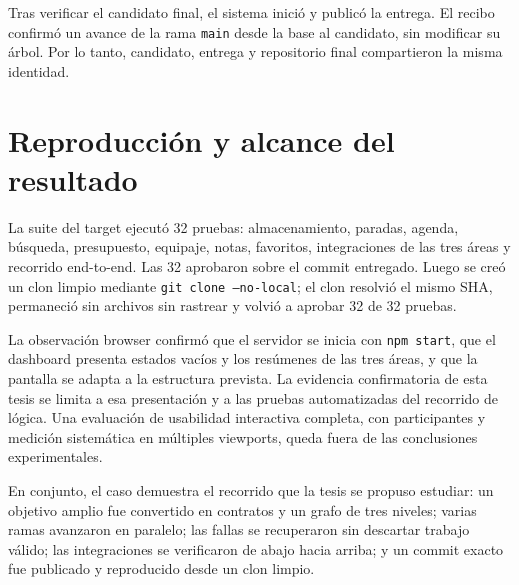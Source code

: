 Tras verificar el candidato final, el sistema inició y publicó la entrega. El
recibo confirmó un avance de la rama \texttt{main} desde la base al candidato,
sin modificar su árbol. Por lo tanto, candidato, entrega y repositorio final
compartieron la misma identidad.

\section{Reproducción y alcance del resultado}

La suite del target ejecutó 32 pruebas: almacenamiento, paradas, agenda,
búsqueda, presupuesto, equipaje, notas, favoritos, integraciones de las tres
áreas y recorrido end-to-end. Las 32 aprobaron sobre el commit entregado. Luego
se creó un clon limpio mediante \texttt{git clone --no-local}; el clon resolvió
el mismo SHA, permaneció sin archivos sin rastrear y volvió a aprobar 32 de 32
pruebas.

La observación browser confirmó que el servidor se inicia con
\texttt{npm start}, que el dashboard presenta estados vacíos y los resúmenes de
las tres áreas, y que la pantalla se adapta a la estructura prevista. La
evidencia confirmatoria de esta tesis se limita a esa presentación y a las
pruebas automatizadas del recorrido de lógica. Una evaluación de usabilidad
interactiva completa, con participantes y medición sistemática en múltiples
viewports, queda fuera de las conclusiones experimentales.

En conjunto, el caso demuestra el recorrido que la tesis se propuso estudiar:
un objetivo amplio fue convertido en contratos y un grafo de tres niveles;
varias ramas avanzaron en paralelo; las fallas se recuperaron sin descartar
trabajo válido; las integraciones se verificaron de abajo hacia arriba; y un
commit exacto fue publicado y reproducido desde un clon limpio.
